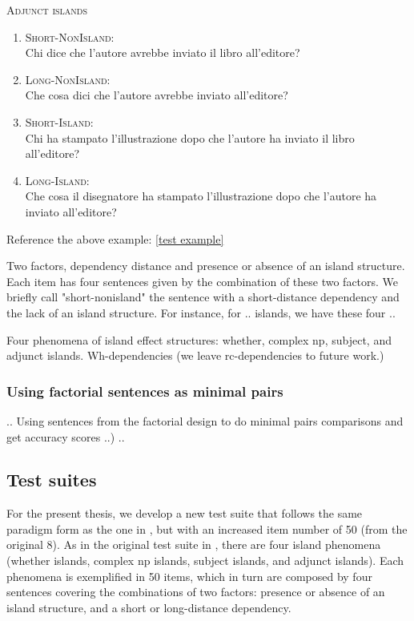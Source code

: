 \begin{example}
	\textsc{Adjunct islands}
		\renewcommand{\labelenumi}{\alph{enumi}.}
		\begin{enumerate}
			\item \textsc{Short-NonIsland:} \\
			Chi dice che l’autore avrebbe inviato il libro all’editore?
			\item \textsc{Long-NonIsland:} \\
			Che cosa dici che l'autore avrebbe inviato all’editore?
			\item \textsc{Short-Island:} \\
			Chi ha stampato l’illustrazione dopo che l'autore ha inviato il libro all’editore?
			\item \textsc{Long-Island:} \\				
			Che cosa il disegnatore ha stampato l’illustrazione dopo che l'autore ha inviato all’editore?
			
		\end{enumerate}

	\label{test example}
\end{example}
Reference the above example: \ref{test example}

Two factors, dependency distance and presence or absence of an island structure. Each item has four sentences given by the combination of these two factors. We briefly call "short-nonisland" the sentence with a short-distance dependency and the lack of an island structure. For instance, for .. islands, we have these four ..


Four phenomena of island effect structures: whether, complex np, subject, and adjunct islands. Wh-dependencies (we leave rc-dependencies to future work.)



\subsubsection{Using factorial sentences as minimal pairs}
..
Using sentences from the factorial design to do minimal pairs comparisons and get accuracy scores ..)
..

\subsection{Test suites}

For the present thesis, we develop a new test suite that follows the same paradigm form as the one in \citet{sprouse2016experimental}, but with an increased item number of 50 (from the original 8). As in the original test suite in \citet{sprouse2016experimental}, there are four island phenomena (whether islands, complex np islands, subject islands, and adjunct islands). Each phenomena is exemplified in 50 items, which in turn are composed by four sentences covering the combinations of two factors: presence or absence of an island structure, and a short or long-distance dependency.

